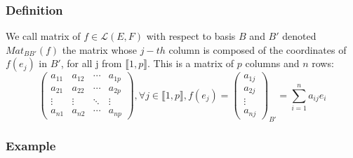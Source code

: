 \documentclass[notitlepage]{math}
\begin{document}
\subsubsection{Definition}
We call matrix of $f \in \mathcal{L}(E,F)$ with respect to basis $B$ and $B'$ denoted $Mat_{BB'}(f)$ the matrix whose $j-th$ column is composed of the coordinates of $f(e_j)$ in $B'$, for all j from $\llbracket 1,p \rrbracket$.
This is a matrix of $p$ columns and $n$ rows:
\[\begin{pmatrix}
    a_{11} & a_{12} & \cdots & a_{1p} \\
    a_{21} & a_{22} & \cdots & a_{2p} \\
    \vdots & \vdots & \ddots & \vdots \\
    a_{n1} & a_{n2} & \cdots & a_{np}
\end{pmatrix}, \forall j \in \llbracket 1,p \rrbracket, f(e_j) = {\begin{pmatrix} a_{1j} \\ a_{2j} \\ \vdots \\ a_{nj} \end{pmatrix}}_{B'} = \sum_{i=1}^{n} a_{ij} e_i\]
\subsubsection{Example}

     
\end{document}
